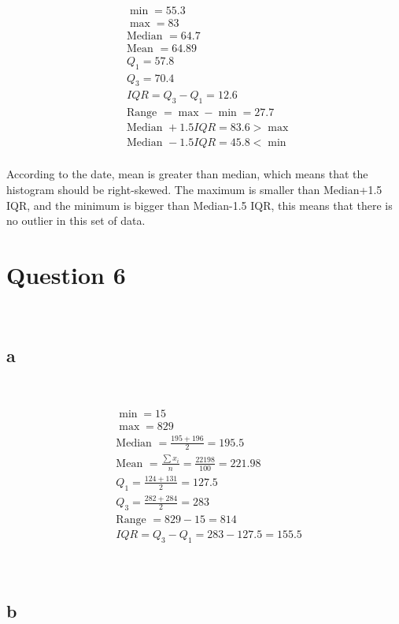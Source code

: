 \documentclass{article}
\begin{document}
~

\begin{align*}
    &\min=55.3\\
    &\max=83\\
    &\text{Median }=64.7\\
    &\text{Mean }=64.89\\
    &Q_1=57.8\\
    &Q_3=70.4\\
    &IQR=Q_3-Q_1=12.6\\
    &\text{Range }=\max-\min=27.7\\
    &\text{Median }+1.5IQR=83.6>\max\\
    &\text{Median }-1.5IQR=45.8<\min\\
\end{align*}

According to the date, mean is greater than median, which means that the histogram should be right-skewed. The maximum is smaller than Median+1.5 IQR, and the minimum is bigger than Median-1.5 IQR, this means that there is no outlier in this set of data.

\newpage

\section*{Question 6}

~

\subsection*{a}

~

\begin{align*}
    &\min=15\\
    &\max=829\\
    &\text{Median }=\frac{195+196}{2}=195.5\\
    &\text{Mean }=\frac{\sum x_i}{n}=\frac{22198}{100}=221.98\\
    &Q_1=\frac{124+131}{2}=127.5\\
    &Q_3=\frac{282+284}{2}=283\\
    &\text{Range }=829-15=814\\
    &IQR=Q_3-Q_1=283-127.5=155.5\\
\end{align*}

~

\subsection*{b}
\end{document}
